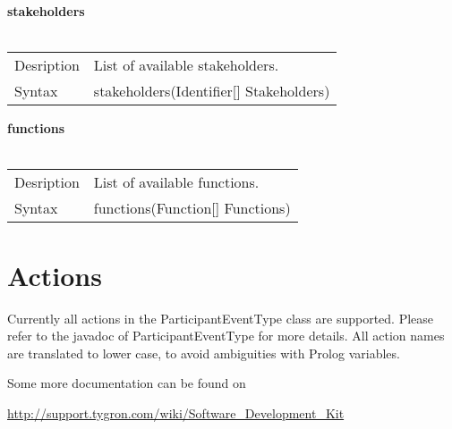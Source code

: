 \documentclass[english,11pt]{article}
\begin{document}
\textbf{stakeholders}\\
\\
\begin{tabularx}{\textwidth}{lX}
 Desription & List of available stakeholders. \\
 Syntax & stakeholders(Identifier[] Stakeholders) \\
\end{tabularx}
\newline

\textbf{functions}\\
\\
\begin{tabularx}{\textwidth}{lX}
 Desription & List of available functions. \\
 Syntax & functions(Function[] Functions) \\
\end{tabularx}
\newline



\section{Actions}

Currently all actions in the ParticipantEventType class are supported. Please refer to the javadoc of ParticipantEventType for more details. All action names are translated to lower case, to avoid ambiguities with Prolog variables.

Some more documentation can be found on

\url{http://support.tygron.com/wiki/Software_Development_Kit}
\end{document}
